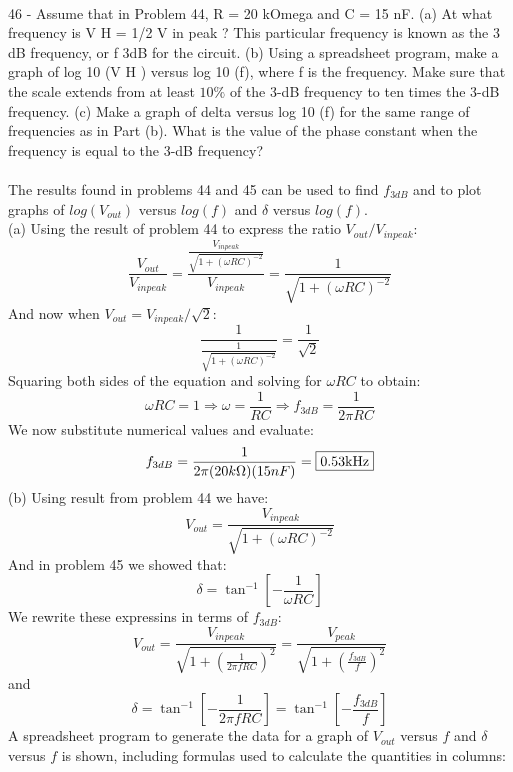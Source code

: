 \documentclass{report}
\begin{document}
\paragraph{}
46 - Assume that in Problem 44, R = 20 kOmega and C = 15 nF. (a) At what frequency is V H = 1/2 V in peak ? This particular frequency is known as the 3 dB frequency, or f 3dB for the circuit. (b) Using a spreadsheet program, make a graph of log 10 (V H ) versus log 10 (f), where f is the frequency. Make sure that the scale extends from at least $10\%$ of the 3-dB frequency to ten times the 3-dB frequency. (c) Make a graph of delta versus log 10 (f) for the same range of frequencies as in Part (b). What is the value of the phase constant when the frequency is equal to the 3-dB frequency?\\
\\
The results found in problems 44 and 45 can be used to find $f_{3dB}$ and to plot graphs of $log(V_{out})$ versus $log(f)$ and $\delta$ versus $log(f)$.\\
(a) Using the result of problem 44 to express the ratio $V_{out} / V_{in peak}$:
$$\frac{V_{out}}{V_{in peak}} = \frac{\frac{V_{in peak}}{\sqrt{1 + (\omega RC)^{-2}}}}{V_{in peak}} = \frac{1}{\sqrt{1 + (\omega RC)^{-2}}}$$
And now when $V_{out} = V_{in peak} / \sqrt{2}$:
$$\frac{1}{\frac{1}{\sqrt{1 + (\omega RC)^{-2}}}} = \frac{1}{\sqrt{2}}$$
Squaring both sides of the equation and solving for $\omega RC$ to obtain:
$$\omega RC = 1 \Rightarrow \omega = \frac{1}{RC} \Rightarrow f_{3dB} = \frac{1}{2\pi RC}$$
We now substitute numerical values and evaluate:
$$f_{3dB} = \frac{1}{2\pi (20k\Omega)(15nF)} = \fbox{0.53kHz}$$
(b) Using result from problem 44 we have:
$$V_{out} = \frac{V_{in peak}}{\sqrt{1 + (\omega RC)^{-2}}}$$
And in problem 45 we showed that:
$$\delta = \tan^{-1} \left[ -\frac{1}{\omega RC} \right]$$
We rewrite these expressins in terms of $f_{3dB}$:
$$V_{out} = \frac{V_{in peak}}{\sqrt{1 + \left( \frac{1}{2\pi fRC} \right)^2}} = \frac{V_{peak}}{\sqrt{1 + \left( \frac{f_{3dB}}{f}\right)^2}}$$
and
$$\delta = \tan^{-1} \left[ -\frac{1}{2\pi fRC} \right] = \tan^{-1} \left[ -\frac{f_{3dB}}{f} \right]$$
A spreadsheet program to generate the data for a graph of $V_{out}$ versus $f$ and $\delta$ versus $f$ is shown, including formulas used to calculate the quantities in columns:
\end{document}
